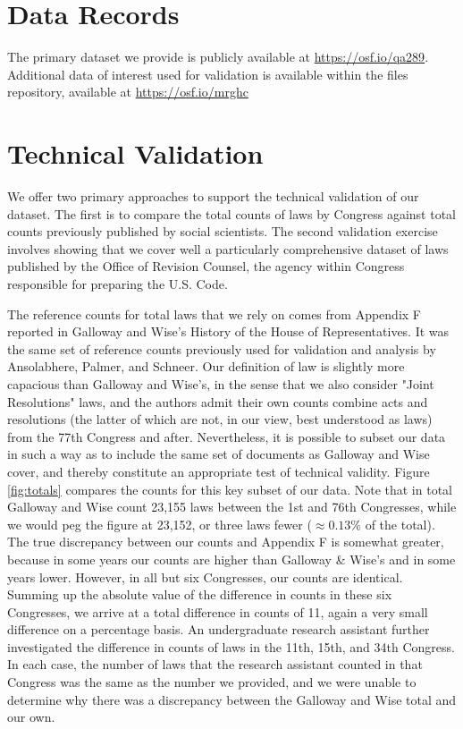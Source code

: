 \documentclass[fleqn,10pt]{wlscirep}
\begin{document}
\section*{Data Records}

The primary dataset\cite{libgober_dataset} we provide is publicly available at \url{https://osf.io/qa289}. Additional data of interest used for validation is available within the files repository, available at \url{https://osf.io/mrghc}


\section*{Technical Validation}

We offer two primary approaches to support the technical validation of our dataset.\cite{libgober_dataset} The first is to compare the total counts of laws by Congress against total counts previously published by social scientists. The second validation exercise involves showing that we cover well a particularly comprehensive dataset of laws published by the Office of Revision Counsel, the agency within Congress  responsible for preparing the U.S. Code.

The reference counts for total laws that we rely on comes from Appendix F reported in Galloway and Wise's History of the House of Representatives\nocite{gallowaywise}. It was the same set of reference counts previously used for validation and analysis by Ansolabhere, Palmer, and Schneer.\cite{ansolabehere_palmer_schneer_2016} Our definition of law is slightly more capacious than Galloway and Wise's, in the sense that we also consider "Joint Resolutions" laws, and the authors admit their own counts combine acts and resolutions (the latter of which are not, in our view, best understood as laws) from the 77th Congress and after. Nevertheless, it is possible to subset our data in such a way as to include the same set of documents as Galloway and Wise cover, and thereby constitute an appropriate test of technical validity. Figure \ref{fig:totals} compares the counts for this key subset of our data. Note that in total Galloway and Wise count 23,155 laws between the 1st and 76th Congresses, while we would peg the figure at 23,152, or three laws fewer ($\approx 0.13\%$ of the total). The true discrepancy between our counts and Appendix F is somewhat greater, because in some years our counts are higher than Galloway \& Wise's and in some years lower. However, in all but six Congresses, our counts are identical. Summing up the absolute value of the difference in counts in these six Congresses, we arrive at a total difference in counts of 11, again a very small difference on a percentage basis. An undergraduate research assistant further investigated the difference in counts of laws in  the 11th, 15th, and 34th Congress. In each case, the number of laws that the research assistant counted in that Congress was the same as the number we provided, and we were unable to determine why there was a discrepancy between the Galloway and Wise total and our own. 
\end{document}
